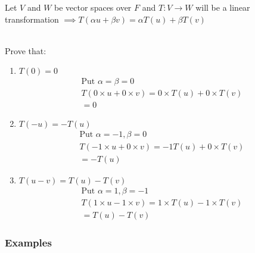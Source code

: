 \documentclass[english,course,fleqn]{lecture}
\begin{document}
\begin{theorem}
	Let $V$ and $W$ be vector spaces over $F$ and $T:V\rightarrow W$ will be a linear transformation
	$\implies T(\alpha u + \beta v) = \alpha T(u) + \beta T(v)$

	\\
	Prove that:

	\begin{enumerate}
		\item $T(0) = 0$
		      \begin{gather*}
			      \text{Put } \alpha = \beta = 0\\
			      T(0\times u + 0\times v) = 0\times T(u) + 0\times T(v)\\
			      = 0
		      \end{gather*}
		\item $T(-u) = - T(u)$
		      \begin{gather*}
			      \text{Put } \alpha = -1, \beta = 0\\
			      T(-1\times u + 0\times v) = -1 T(u) + 0\times T(v)\\
			      = -T(u)
		      \end{gather*}
		\item $T(u-v) = T(u) - T(v)$
		      \begin{gather*}
			      \text{Put } \alpha = 1, \beta = -1\\
			      T(1\times u - 1\times v) = 1\times T(u) - 1\times T(v)\\
			      = T(u) - T(v)
		      \end{gather*}
	\end{enumerate}
\end{theorem}


\subsubsection{Examples}
\end{document}
